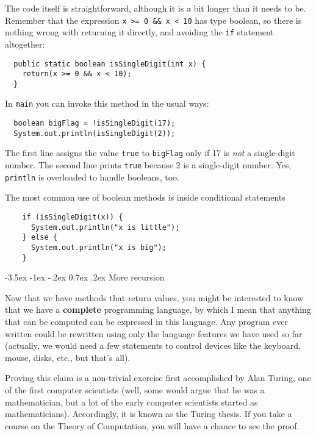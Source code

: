 \documentclass{book}
\makeatletter
\renewcommand{\section}{\@startsection 
    {section} {1} {0mm}%
    {-3.5ex \@plus -1ex \@minus -.2ex}%
    {0.7ex \@plus.2ex}%
    {\normalfont\Large\bfseries}}
\makeatother
\begin{document}
The code itself is straightforward, although it is a bit longer than
it needs to be.  Remember that the expression {\tt x >= 0 \&\& x < 10}
has type boolean, so there is nothing wrong with returning it
directly, and avoiding the {\tt if} statement altogether:

\begin{verbatim}
  public static boolean isSingleDigit(int x) {
    return(x >= 0 && x < 10);
  }
\end{verbatim}
%
In {\tt main} you can invoke this method in the usual ways:

\begin{verbatim}
  boolean bigFlag = !isSingleDigit(17);
  System.out.println(isSingleDigit(2));
\end{verbatim}
%
The first line assigns the value {\tt true} to {\tt bigFlag}
only if 17 is {\em not} a single-digit number.  The second
line prints {\tt true} because 2 is a single-digit number.
Yes, {\tt println} is overloaded to handle booleans, too.

The most common use of boolean methods is inside conditional
statements

\begin{verbatim}
    if (isSingleDigit(x)) {
      System.out.println("x is little");
    } else {
      System.out.println("x is big");
    }
\end{verbatim}

\section {More recursion}

Now that we have methods that return values, you might be interested
to know that we have a {\bf complete} programming language, by which I
mean that anything that can be computed can be expressed in this
language.  Any program ever written could be rewritten
using only the language features we have used so far (actually, we
would need a few statements to control devices like the keyboard, mouse,
disks, etc., but that's all).


Proving this claim is a non-trivial exercise first
accomplished by Alan Turing, one of the first computer scientists
(well, some would argue that he was a mathematician, but a lot of the
early computer scientists started as mathematicians).  Accordingly, it
is known as the Turing thesis.  If you take a course on the Theory of
Computation, you will have a chance to see the proof.
\end{document}
